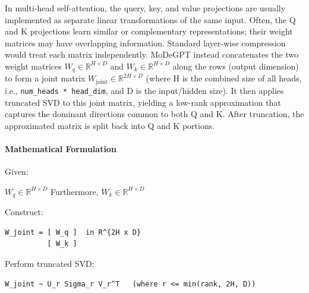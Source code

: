 In multi-head self-attention, the query, key, and value projections are usually implemented as separate linear transformations of the same input. Often, the Q and K projections learn similar or complementary representations; their weight matrices may have overlapping information. Standard layer-wise compression would treat each matrix independently. MoDeGPT instead concatenates the two weight matrices $W_q \in \mathbb{R}^{H \times D}$ and $W_k \in \mathbb{R}^{H \times D}$ along the rows (output dimension) to form a joint matrix $W_{\text{joint}} \in \mathbb{R}^{2H \times D}$ (where H is the combined size of all heads, i.e., \texttt{num\_heads * head\_dim}, and D is the input/hidden size). It then applies truncated SVD to this joint matrix, yielding a low-rank approximation that captures the dominant directions common to both Q and K. After truncation, the approximated matrix is split back into Q and K portions.

\paragraph{Mathematical Formulation}

Given:

$W_q \in \mathbb{R}^{H \times D}$ Furthermore, $W_k \in \mathbb{R}^{H \times D}$


Construct:

\vspace{0.5em}
\begin{mdframed}[backgroundcolor=codebg, linecolor=codeframe, linewidth=1pt, roundcorner=4pt, innerleftmargin=2pt, innerrightmargin=5pt, innertopmargin=5pt, innerbottommargin=5pt]
\begin{lstlisting}
W_joint = [ W_q ]  in R^{2H x D}
          [ W_k ]
\end{lstlisting}
\end{mdframed}
\vspace{0.5em}

Perform truncated SVD:

\vspace{0.5em}
\begin{mdframed}[backgroundcolor=codebg, linecolor=codeframe, linewidth=1pt, roundcorner=4pt, innerleftmargin=2pt, innerrightmargin=5pt, innertopmargin=5pt, innerbottommargin=5pt]
\begin{lstlisting}
W_joint ~ U_r Sigma_r V_r^T   (where r <= min(rank, 2H, D))
\end{lstlisting}
\end{mdframed}
\vspace{0.5em}

